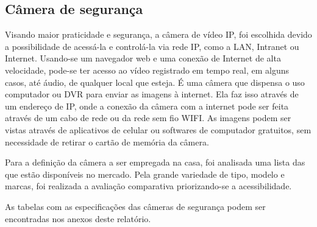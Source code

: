 \subsection{Câmera de segurança}
\par Visando maior praticidade e segurança, a câmera de vídeo IP, foi escolhida devido a possibilidade de acessá-la e controlá-la via rede IP, como a LAN, Intranet ou Internet. Usando-se um navegador web e uma conexão de Internet de alta velocidade, pode-se ter acesso ao vídeo registrado em tempo real, em alguns casos, até áudio, de qualquer local que esteja. É uma câmera que dispensa o uso computador ou DVR para enviar as imagens à internet. Ela faz isso através de um endereço de IP, onde a conexão da câmera com a internet pode ser feita através de um cabo de rede ou da rede sem fio WIFI. As imagens podem ser vistas através de aplicativos de celular ou softwares de computador gratuitos, sem necessidade de retirar o cartão de memória da câmera.
\par Para a definição da câmera a ser empregada na casa, foi analisada uma lista das que estão disponíveis no mercado. Pela grande variedade de tipo, modelo e marcas, foi realizada a avaliação comparativa priorizando-se a acessibilidade.
\par As tabelas com as especificações das câmeras de segurança podem ser encontradas nos anexos deste relatório.
